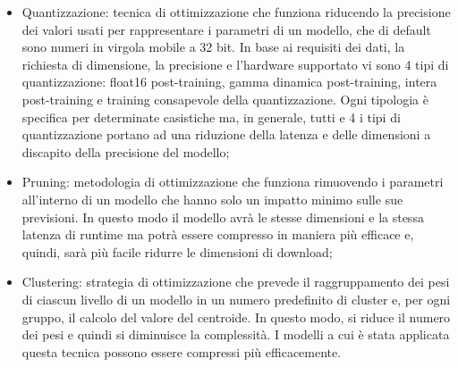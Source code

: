 \begin{itemize}
    \item Quantizzazione: tecnica di ottimizzazione che funziona riducendo la precisione dei valori usati per rappresentare i parametri di un modello,
    che di default sono numeri in virgola mobile a 32 bit. In base ai requisiti dei dati, la richiesta di dimensione, la precisione e l’hardware supportato vi
    sono 4 tipi di quantizzazione: float16 post-training, gamma dinamica post-training, intera post-training e training consapevole della quantizzazione.
    Ogni tipologia è specifica per determinate casistiche ma, in generale, tutti e 4 i tipi di quantizzazione portano ad una riduzione della latenza e delle
    dimensioni a discapito della precisione del modello;
    \item Pruning: metodologia di ottimizzazione che funziona rimuovendo i parametri all’interno di un modello che hanno solo un impatto minimo sulle
    sue previsioni. In questo modo il modello avrà le stesse dimensioni e la stessa latenza di runtime ma potrà essere compresso in maniera più efficace
    e, quindi, sarà più facile ridurre le dimensioni di download;
    \item Clustering: strategia di ottimizzazione che prevede il raggruppamento dei pesi di ciascun livello di un modello in un numero predefinito di
    cluster e, per ogni gruppo, il calcolo del valore del centroide. In questo modo, si riduce il numero dei pesi e quindi si diminuisce la complessità.
    I modelli a cui è stata applicata questa tecnica possono essere compressi più efficacemente.
\end{itemize}

